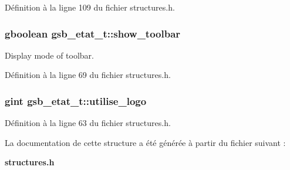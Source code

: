 Définition à la ligne 109 du fichier structures.h.

\subsubsection[{show\_\-toolbar}]{\setlength{\rightskip}{0pt plus 5cm}gboolean {\bf gsb\_\-etat\_\-t::show\_\-toolbar}}\label{structgsb__etat__t_aac2ec593dc36ada550b5792296d48f2e}
Display mode of toolbar. 

Définition à la ligne 69 du fichier structures.h.

\subsubsection[{utilise\_\-logo}]{\setlength{\rightskip}{0pt plus 5cm}gint {\bf gsb\_\-etat\_\-t::utilise\_\-logo}}\label{structgsb__etat__t_a2228cfa5b20058093f1a82e9c50d1b0a}


Définition à la ligne 63 du fichier structures.h.



La documentation de cette structure a été générée à partir du fichier suivant :\begin{DoxyCompactItemize}
\item 
{\bf structures.h}\end{DoxyCompactItemize}
